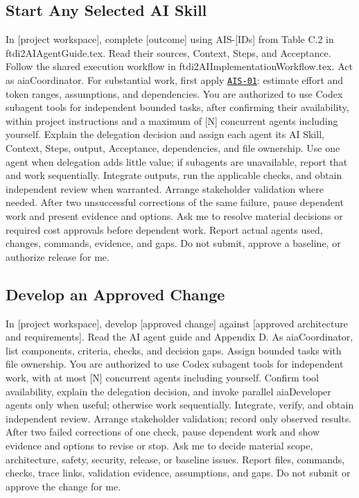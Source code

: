 \begin{samepage}
\subsection{Start Any Selected AI Skill}
\label{Section:AIStartSelectedTaskPrompt}

\begingroup\ttfamily\raggedright
\noindent In [project workspace], complete [outcome] using AIS-[IDs] from Table C.2 in ftdi2AIAgentGuide.tex. Read their sources, Context, Steps, and Acceptance. Follow the shared execution workflow in ftdi2AIImplementationWorkflow.tex. Act as aiaCoordinator. For substantial work, first apply \hyperref[Skill:AIS-01]{\texttt{AIS-01}}: estimate effort and token ranges, assumptions, and dependencies. You are authorized to use Codex subagent tools for independent bounded tasks, after confirming their availability, within project instructions and a maximum of [N] concurrent agents including yourself. Explain the delegation decision and assign each agent its AI Skill, Context, Steps, output, Acceptance, dependencies, and file ownership. Use one agent when delegation adds little value; if subagents are unavailable, report that and work sequentially. Integrate outputs, run the applicable checks, and obtain independent review when warranted. Arrange stakeholder validation where needed. After two unsuccessful corrections of the same failure, pause dependent work and present evidence and options. Ask me to resolve material decisions or required cost approvals before dependent work. Report actual agents used, changes, commands, evidence, and gaps. Do not submit, approve a baseline, or authorize release for me.\par
\endgroup

\end{samepage}

\begin{samepage}
\subsection{Develop an Approved Change}

\begingroup\ttfamily\raggedright
\noindent In [project workspace], develop [approved change] against [approved architecture and requirements]. Read the AI agent guide and Appendix D. As aiaCoordinator, list components, criteria, checks, and decision gaps. Assign bounded tasks with file ownership. You are authorized to use Codex subagent tools for independent work, with at most [N] concurrent agents including yourself. Confirm tool availability, explain the delegation decision, and invoke parallel aiaDeveloper agents only when useful; otherwise work sequentially. Integrate, verify, and obtain independent review. Arrange stakeholder validation; record only observed results. After two failed corrections of one check, pause dependent work and show evidence and options to revise or stop. Ask me to decide material scope, architecture, safety, security, release, or baseline issues. Report files, commands, checks, trace links, validation evidence, assumptions, and gaps. Do not submit or approve the change for me.\par
\endgroup

\end{samepage}

